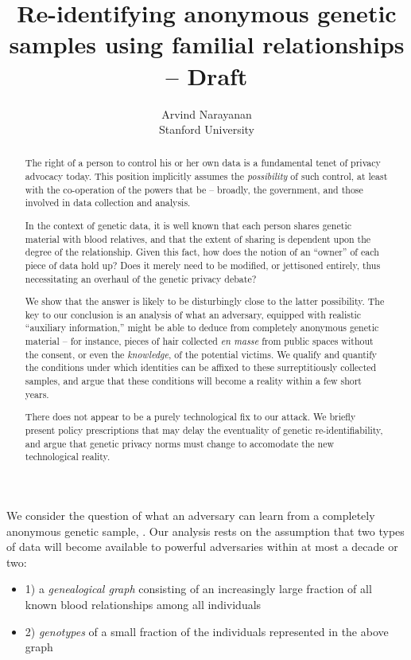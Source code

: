 \documentclass[conference,compsoc]{IEEEtran}
\title{Re-identifying anonymous genetic samples using familial relationships -- Draft}
\author{Arvind Narayanan \\
{\small Stanford University}}
\begin{document}
\maketitle

\begin{abstract}
The right of a person to control his or her own data is a fundamental tenet of privacy advocacy today. This position implicitly assumes the {\em possibility} of such control, at least with the co-operation of the powers that be -- broadly, the government, and those involved in data collection and analysis.

In the context of genetic data, it is well known that each person shares genetic material with blood relatives, and that the extent of sharing is dependent upon the degree of the relationship. Given this fact, how does the notion of an ``owner'' of each piece of data hold up? Does it merely need to be modified, or jettisoned entirely, thus necessitating an overhaul of the genetic privacy debate?

We show that the answer is likely to be disturbingly close to the latter possibility. The key to our conclusion is an analysis of what an adversary, equipped with realistic ``auxiliary information,'' might be able to deduce from completely anonymous genetic material -- for instance, pieces of hair collected {\em en masse} from public spaces without the consent, or even the {\em knowledge}, of the potential victims. We qualify and quantify the conditions under which identities can be affixed to these surreptitiously collected samples, and argue that these conditions will become a reality within a few short years.

There does not appear to be a purely technological fix to our attack. We briefly present policy prescriptions that may delay the eventuality of genetic re-identifiability, and argue that genetic privacy norms must change to accomodate the new technological reality.
\end{abstract}

We consider the question of what an adversary can learn from a completely anonymous genetic sample, . Our analysis rests on the assumption that two types of data will become available to powerful adversaries within at most a decade or two: 
\begin{itemize}
\item
1) a {\em genealogical graph} consisting of an increasingly large fraction of all known blood relationships among all individuals
\item
2) {\em genotypes} of a small fraction of the individuals represented in the above graph
\end{itemize}
\end{document}
